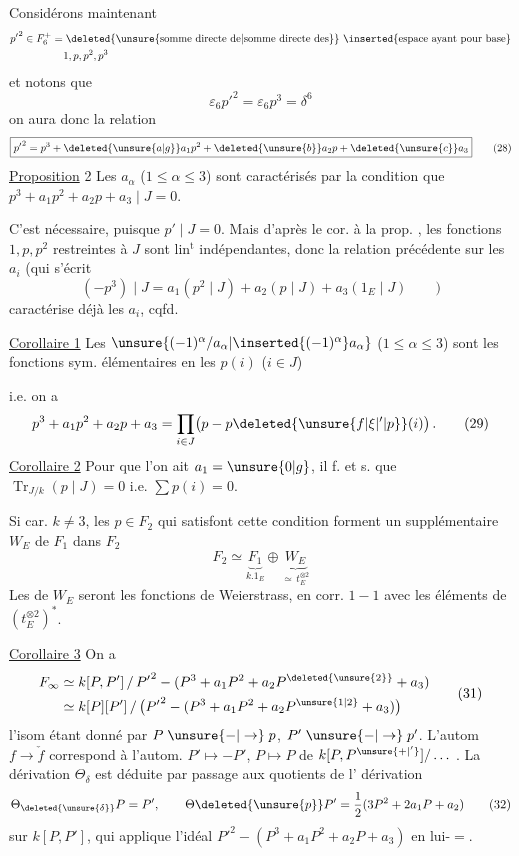  Considérons maintenant
\[
 \begin{aligned}
 &{p'}^{2}\in F_6^+=\deleted{\text{\unsure{somme directe de|somme directe des}}}\ \inserted{\text{espace ayant pour base}}\\
 &\hspace{5em}1,p,p^2,p^3
 \end{aligned}
\]
et notons que
\[
 \varepsilon_6{p'}^2=\varepsilon_6p^3=\delta^6
\]
on aura donc la relation
\[
 \boxed{{p'}^2=p^3+\deleted{\unsure{a|g}}a_1p^2+\deleted{\unsure{b}}a_2p+\deleted{\unsure{c}}a_3} \tag*{(28)}
\]
\uline{Proposition} 2 Les $a_\alpha$ ($1\leq\alpha\leq3$) sont caractérisés par la condition que $p^3+a_1p^2+a_2p+a_3\mid J=0$.

C'est nécessaire, puisque $p'\mid J=0$. Mais d'après le cor. à la prop. , les fonctions $1,p,p^2$ restreintes à $J$ sont lin$^{\mathrm t}$ indépendantes, donc la relation précédente sur les $a_i$ (qui s'écrit
\[
 (-p^3)\mid J=a_1(p^2\mid J)+a_2(p\mid J)+a_3(1_E\mid J)\qquad)
\]
caractérise déjà les $a_i$, cqfd.

\uline{Corollaire 1} Les $\unsure{(-1)^\alpha/a_\alpha|\inserted{(-1)^\alpha}a_\alpha}$ ($1\leq\alpha\leq3$) sont les fonctions sym. élémentaires en les $p(i)$ ($i\in J$)

i.e. on a
\[
 p^3+a_1p^2+a_2p+a_3=\prod_{i\in J}\bigl(p-p\deleted{\unsure{f|\xi|'|p}}(i)\bigr)\,. \tag*{(29)}
\]
\uline{Corollaire 2} Pour que l'on ait $a_1=\unsure{0|g}$, il f. et s. que $\operatorname{Tr}_{J/k}(p\mid J)=0$ i.e. $\sum p(i)=0$.

Si car. $k\ne3$, les $p\in F_2$ qui satisfont cette condition forment un supplémentaire $W_E$ de $F_1$ dans $F_2$
\[
 F_2\simeq\underbrace{F_1}_{k.1_E}\oplus\underbrace{W_E}_{\simeq\, t_E^{\otimes2}} \tag*{(30)}
\]
Les   de $W_E$ seront  les fonctions de Weierstrass,
en corr. $1-1$ avec les éléments de $(t_E^{\otimes2})^*$.

\uline{Corollaire 3} On a
\[
 \begin{aligned}
 F_\infty&\simeq k[P,P']\,/\,{P'}^2-(P^3+a_1P^2+a_2P^{\deleted{\unsure{2}}}+a_3)\\
 &\simeq k[P][P']\,/\,\bigl({P'}^2-(P^3+a_1P^2+a_2P^{\unsure{1|2}}+a_3)\bigr)
 \end{aligned} \tag*{(31)}
\]
l'isom étant donné par $P\mathrel{\unsure{-|\to}}p$, $P'\mathrel{\unsure{-|\to}}p'$. L'autom $f\to\check f$ correspond à l'autom. $P'\mapsto-P'$, $P\mapsto P$ de $k[P,P^{\unsure{+|'}}]/\ldots$ . La dérivation $\Theta_\delta$ est déduite par passage aux quotients de l' dérivation
\[
 \Theta_{\deleted{\unsure{\delta}}}P=P',\qquad
 \Theta\deleted{\unsure{p}}P'=\frac12(3P^2+2a_1P+a_2) \tag*{(32)}
\]
sur $k[P,P']$, qui applique l'idéal $ {P'}^2-(P^3+a_1P^2+a_2P+a_3)$ en lui-$=$.

